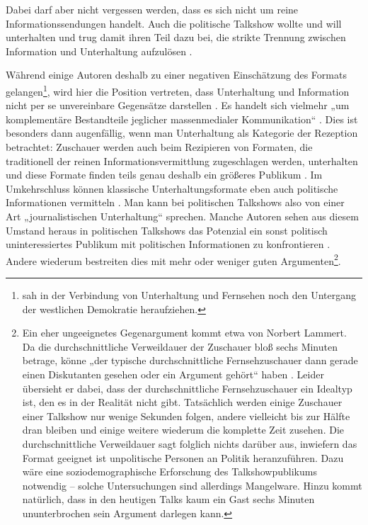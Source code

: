 Dabei darf aber nicht vergessen werden, dass es sich nicht um reine Informationssendungen handelt. Auch die politische Talkshow wollte und will unterhalten und trug damit ihren Teil dazu bei, die strikte Trennung zwischen Information und Unterhaltung aufzulösen \parencite[100]{kalverkaemperKommentierteBibliographieZur1980}.

Während einige Autoren deshalb zu einer negativen Einschätzung des Formats gelangen\footnote{\textcite{postmanWirAmuesierenUns2003} sah in der Verbindung von Unterhaltung und Fernsehen noch den Untergang der westlichen Demokratie heraufziehen.}, wird hier die Position vertreten, dass Unterhaltung und Information nicht per se unvereinbare Gegensätze darstellen \parencites{bosshartInformationUndOder2007}[57-62]{doernerPolitainmentPolitikMedialen2001}. Es handelt sich vielmehr „um komplementäre Bestandteile jeglicher massenmedialer Kommunikation“ \parencite[70]{luenenborgUnterhaltungAlsJournalismus2007}. Dies ist besonders dann augenfällig, wenn man Unterhaltung als Kategorie der Rezeption betrachtet: Zuschauer werden auch beim Rezipieren von Formaten, die traditionell der reinen Informationsvermittlung zugeschlagen werden, unterhalten und diese Formate finden teils genau deshalb ein größeres Publikum \parencite[74ff.]{luenenborgUnterhaltungAlsJournalismus2007}. Im Umkehrschluss können klassische Unterhaltungsformate eben auch politische Informationen vermitteln \parencite[59f.]{doernerPolitainmentPolitikMedialen2001}. Man kann bei politischen Talkshows also von einer Art „journalistischen Unterhaltung“ sprechen. Manche Autoren sehen aus diesem Umstand heraus in politischen Talkshows das Potenzial ein sonst politisch uninteressiertes Publikum mit politischen Informationen zu konfrontieren  \parencites[240]{doernerPolitainmentPolitikMedialen2001}[51ff.]{bockPolitainmentImDeutschen2009}. Andere wiederum bestreiten dies mit mehr oder weniger guten Argumenten\footnote{Ein eher ungeeignetes Gegenargument kommt etwa von Norbert Lammert. Da die durchschnittliche Verweildauer der Zuschauer bloß sechs Minuten betrage, könne „der typische durchschnittliche Fernsehzuschauer dann gerade einen Diskutanten gesehen oder ein Argument gehört“ haben \parencite[120]{gaeblerInterviewMitDr2011}. Leider übersieht er dabei, dass der durchschnittliche Fernsehzuschauer ein Idealtyp ist, den es in der Realität nicht gibt. Tatsächlich werden einige Zuschauer einer Talkshow nur wenige Sekunden folgen, andere vielleicht bis zur Hälfte dran bleiben und einige weitere wiederum die komplette Zeit zusehen. Die durchschnittliche Verweildauer sagt folglich nichts darüber aus, inwiefern das Format geeignet ist unpolitische Personen an Politik heranzuführen. Dazu wäre eine soziodemographische Erforschung des Talkshowpublikums notwendig – solche Untersuchungen sind allerdings Mangelware. Hinzu kommt natürlich, dass in den heutigen Talks kaum ein Gast sechs Minuten ununterbrochen sein Argument darlegen kann.}.

